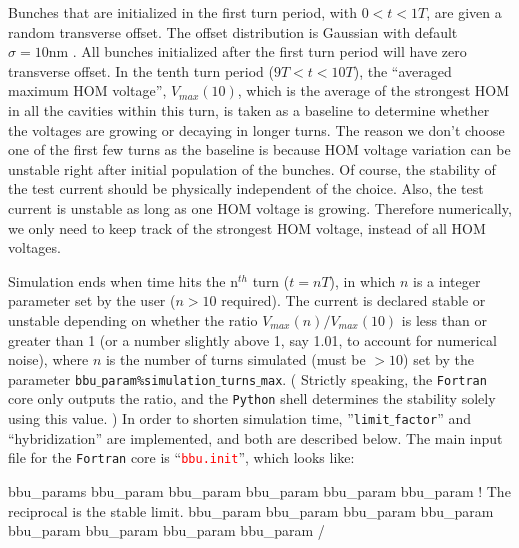 \documentclass{hitec}
\begin{document}
Bunches that are initialized in the first turn period, with $0 < t <1T$, are given a random transverse offset. The offset distribution is Gaussian with default $\sigma = 10 \text{nm}$ . All bunches initialized after the first turn period will have zero transverse offset. In the tenth turn period ($9T < t < 10T$), the ``averaged maximum HOM voltage'', $V_{max}(10)$, which is the average of the strongest HOM in all the cavities within this turn, is taken as a baseline to determine whether the voltages are growing or decaying in longer turns. The reason we don't choose one of the first few turns as the baseline is because HOM voltage variation can be unstable right after initial population of the bunches. Of course, the stability of the test current should be physically independent of the choice. Also, the test current is unstable as long as one HOM voltage is growing. Therefore numerically, we only need to keep track of the strongest HOM voltage, instead of all HOM voltages.

Simulation ends when time hits the n$^{th}$ turn ($t = nT$), in which $n$ is a integer parameter set by the user ($n>10$ required). The current is declared stable or unstable depending on whether the ratio $V_{max}(n)/V_{max}(10)$ is less than or greater than 1 (or a number slightly above 1, say 1.01, to account for numerical noise), where $n$ is the number of
turns simulated (must be $>10$) set by the parameter \texttt{bbu$\_$param\%simulation$\_$turns$\_$max}. ( Strictly speaking, the \texttt{Fortran} core only outputs the ratio, and the \texttt{Python} shell determines the stability solely using this value. ) In order to shorten simulation time, ''\texttt{limit$\_$factor}'' and ``hybridization'' are implemented, and both are described below.
\bigbreak
The main input file for the \texttt{Fortran} core is ``\textcolor{red}{\texttt{bbu.init}}'', which looks like:
\begin{code}
bbu_params 
bbu_param%
bbu_param%
bbu_param%
bbu_param%
bbu_param%
                                  ! The reciprocal is the stable limit.
bbu_param%
bbu_param%
bbu_param%
bbu_param%
bbu_param%
bbu_param%
bbu_param%
bbu_param%
/
\end{code}
\end{document}
